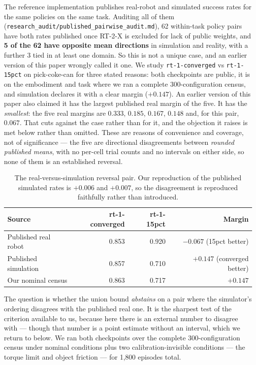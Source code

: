 \documentclass[pdflatex,iicol,sn-apa]{sn-jnl}
\theoremstyle{remark}
\begin{document}
The reference implementation publishes real-robot and simulated success rates for the same policies
on the same task. Auditing all of them
(\texttt{research\_audit/\allowbreak published\_\allowbreak pairwise\_audit.md}), 62
within-task policy pairs have both rates published once RT-2-X is excluded for lack of public
weights, and \textbf{5 of the 62 have opposite mean directions} in simulation and reality, with a
further 3 tied in at least one domain. So this is not a unique case, and an earlier version of this
paper wrongly called it one. We study \texttt{rt-1-converged} vs \texttt{rt-1-15pct} on
pick-coke-can \citep{brohan2023rt1} for three stated reasons: both checkpoints are public, it is on
the embodiment and task where we ran a complete 300-configuration census, and simulation declares it
with a clear margin ($+0.147$). An earlier version of this paper also claimed it has the largest
published real margin of the five. It has the \emph{smallest}: the five real margins are $0.333$,
$0.185$, $0.167$, $0.148$ and, for this pair, $0.067$. That cuts against the case rather than for
it, and the objection it raises is met below rather than omitted. These are reasons of convenience
and coverage, not of significance --- the
five are directional disagreements between \emph{rounded published means}, with no per-cell trial
counts and no intervals on either side, so none of them is an established reversal.

\begin{table}[t]
\caption{The real-versus-simulation reversal pair. Our reproduction of the published simulated rates
is $+0.006$ and $+0.007$, so the disagreement is reproduced faithfully rather than
introduced.}\label{tab9}
\begin{tabular}{@{}lrrr@{}}
\toprule
Source & rt-1-converged & rt-1-15pct & Margin \\
\midrule
Published real robot & 0.853 & 0.920 & $\mathbf{-0.067}$ (15pct better) \\
Published simulation & 0.857 & 0.710 & $\mathbf{+0.147}$ (converged better) \\
Our nominal census & 0.863 & 0.717 & $+0.147$ \\
\bottomrule
\end{tabular}
\end{table}

The question is whether the union bound \emph{abstains} on a pair where the simulator's ordering
disagrees with the published real one. It is the sharpest test of the criterion available to us,
because here there is an external number to disagree with --- though that number is a point estimate
without an interval, which we return to below. We ran both checkpoints over the complete
300-configuration census under nominal conditions plus two calibration-invisible conditions --- the
torque limit and object friction --- for 1{,}800 episodes total.
\end{document}
